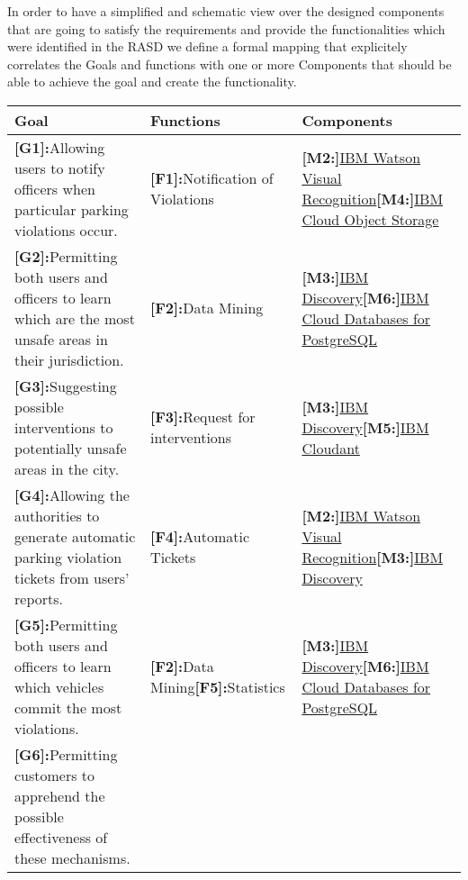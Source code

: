 In order to have a simplified and schematic view over the designed components that are going to satisfy the requirements and provide the functionalities which were identified in the RASD we define a formal mapping that explicitely correlates the Goals and functions with one or more Components that should be able to achieve the goal and create the functionality.



\begin{table}[htp]
\begin{center}
\begin{tabular}{|p{5cm}|p{5cm}|p{5cm}|}
\hline
Goal&Functions&Components\\
\hline
\textbf{[G1]:}Allowing users to notify officers when particular parking violations occur.&
\textbf{[F1]:}Notification of Violations&
\textbf{[M2:]}\hyperlink{watson}{IBM Watson Visual Recognition}\newline\textbf{[M4:]}\hyperlink{cloudObjectStorage}{IBM Cloud Object Storage}\\
\hline
\textbf{[G2]:}Permitting both users and officers to learn which are the most unsafe areas in their jurisdiction.&
\textbf{[F2]:}Data Mining&
\textbf{[M3:]}\hyperlink{discovery}{IBM Discovery}\newline\textbf{[M6:]}\hyperlink{postgres}{IBM Cloud Databases for PostgreSQL}\\
\hline
\textbf{[G3]:}Suggesting possible interventions to potentially unsafe areas in the city.&
\textbf{[F3]:}Request for interventions&
\textbf{[M3:]}\hyperlink{discovery}{IBM Discovery}\newline\textbf{[M5:]}\hyperlink{cloudant}{IBM Cloudant}\\
\hline
\textbf{[G4]:}Allowing the authorities to generate automatic parking violation tickets from users’ reports.&
\textbf{[F4]:}Automatic Tickets&
\textbf{[M2:]}\hyperlink{watson}{IBM Watson Visual Recognition}\newline\textbf{[M3:]}\hyperlink{discovery}{IBM Discovery}\\
\hline
\textbf{[G5]:}Permitting both users and officers to learn which vehicles commit the most violations.&
\textbf{[F2]:}Data Mining\newline\textbf{[F5]:}Statistics&
\textbf{[M3:]}\hyperlink{discovery}{IBM Discovery}\newline\textbf{[M6:]}\hyperlink{postgres}{IBM Cloud Databases for PostgreSQL}\\
\hline
\textbf{[G6]:}Permitting customers to apprehend the possible effectiveness of these mechanisms.&

\end{tabular}
\end{center}
\end{table}
